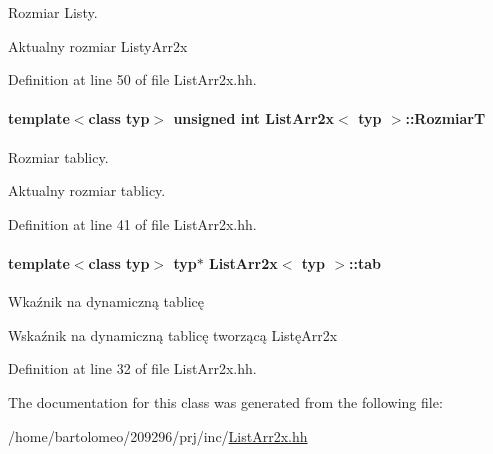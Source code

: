 Rozmiar Listy. 

Aktualny rozmiar Listy\-Arr2x 

Definition at line 50 of file List\-Arr2x.\-hh.

\hypertarget{class_list_arr2x_aa25f050acca08e308c9b508f3ed8c912}{
\paragraph[{Rozmiar\-T}]{\setlength{\rightskip}{0pt plus 5cm}template$<$class typ$>$ unsigned int {\bf List\-Arr2x}$<$ typ $>$\-::Rozmiar\-T\hspace{0.3cm}{\ttfamily [private]}}}\label{class_list_arr2x_aa25f050acca08e308c9b508f3ed8c912}


Rozmiar tablicy. 

Aktualny rozmiar tablicy. 

Definition at line 41 of file List\-Arr2x.\-hh.

\hypertarget{class_list_arr2x_aea5c139721e078af30bdc3c46cf58841}{
\paragraph[{tab}]{\setlength{\rightskip}{0pt plus 5cm}template$<$class typ$>$ typ$\ast$ {\bf List\-Arr2x}$<$ typ $>$\-::tab\hspace{0.3cm}{\ttfamily [private]}}}\label{class_list_arr2x_aea5c139721e078af30bdc3c46cf58841}


Wkaźnik na dynamiczną tablicę 

Wskaźnik na dynamiczną tablicę tworzącą Listę\-Arr2x 

Definition at line 32 of file List\-Arr2x.\-hh.



The documentation for this class was generated from the following file\-:\begin{DoxyCompactItemize}
\item 
/home/bartolomeo/209296/prj/inc/\hyperlink{_list_arr2x_8hh}{List\-Arr2x.\-hh}\end{DoxyCompactItemize}
